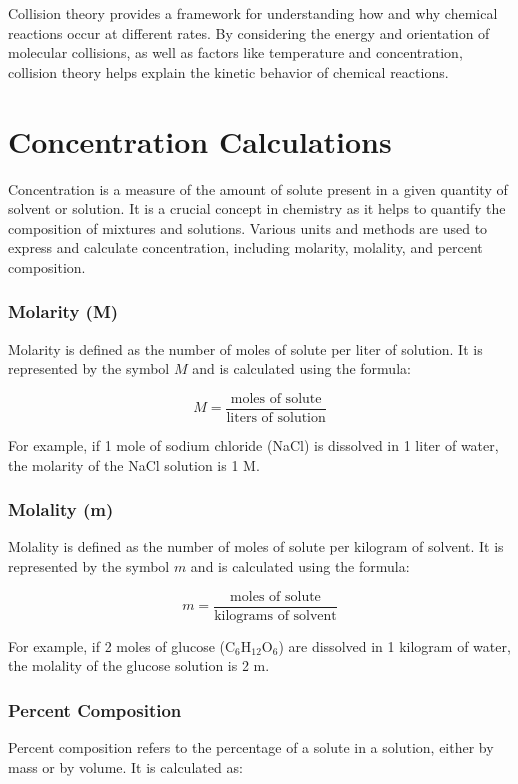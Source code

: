 \documentclass[10pt, roman]{article}
\begin{document}
Collision theory provides a framework for understanding how and why chemical reactions occur at different rates. By considering the energy and orientation of molecular collisions, as well as factors like temperature and concentration, collision theory helps explain the kinetic behavior of chemical reactions.

\section{Concentration Calculations}
Concentration is a measure of the amount of solute present in a given quantity of solvent or solution. It is a crucial concept in chemistry as it helps to quantify the composition of mixtures and solutions. Various units and methods are used to express and calculate concentration, including molarity, molality, and percent composition.

\subsubsection{Molarity (M)}

Molarity is defined as the number of moles of solute per liter of solution. It is represented by the symbol \( M \) and is calculated using the formula:

\[
M = \frac{\text{moles of solute}}{\text{liters of solution}}
\]

For example, if 1 mole of sodium chloride (NaCl) is dissolved in 1 liter of water, the molarity of the NaCl solution is 1 M.

\subsubsection{Molality (m)}

Molality is defined as the number of moles of solute per kilogram of solvent. It is represented by the symbol \( m \) and is calculated using the formula:

\[
m = \frac{\text{moles of solute}}{\text{kilograms of solvent}}
\]

For example, if 2 moles of glucose (C$_6$H$_{12}$O$_6$) are dissolved in 1 kilogram of water, the molality of the glucose solution is 2 m.

\subsubsection{Percent Composition}

Percent composition refers to the percentage of a solute in a solution, either by mass or by volume. It is calculated as:
\end{document}
